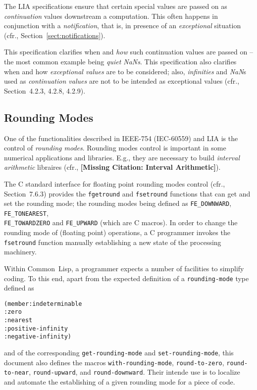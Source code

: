 \documentclass[10pt,fleqn]{article}
\newcommand{\CL}{\textsf{Common~Lisp}}
\newcommand{\CLang}{\textsf{C}}
\newcommand{\checkcite}[1]{{\textbf{[Missing Citation: #1]}}}
\newcommand{\code}[1]{\texttt{#1}}
\newcommand{\clieeeterm}[1]{\textit{#1}}
\newcommand{\IEEEFPStd}{IEEE-754}
\newcommand{\IECFPStd}{IEC-60559}
\begin{document}
The LIA specifications ensure that certain special values are passed
on as \emph{continuation} values downstream a computation.  This often
happens in conjunction with a \emph{notification}, that is, in
presence of an \emph{exceptional} situation (cfr.,
Section~\ref{sect:notifications}).

This specification clarifies when and \emph{how} such continuation
values are passed on -- the most common example being
\clieeeterm{quiet NaNs}.  This specification also clarifies when and
how \emph{exceptional values} are to be considered; also,
\clieeeterm{infinities} and \clieeeterm{NaN}s used as
\emph{continuation values} are not to be intended as exceptional
values (cfr., \cite{2012:LIA1} Section~4.2.3, 4.2.8, 4.2.9).



\subsection{Rounding Modes}

One of the functionalities described in \IEEEFPStd{} (\IECFPStd{}) and LIA is
the control of \emph{rounding modes}.  Rounding modes control is
important in some numerical applications and libraries.  E.g., they
are necessary to build \emph{interval arithmetic} libraires (cfr.,
\checkcite{Interval Arithmetic}).

The \CLang{} standard interface for floating point rounding modes
control (cfr., \cite{2018:C18} Section~7.6.3) provides the \code{fgetround}
and \code{fsetround} functions that can get and set the rounding mode;
the rounding modes being defined as \code{FE\_DOWNWARD},
\code{FE\_TONEAREST},\\
\code{FE\_TOWARDZERO} and \code {FE\_UPWARD} (which are \CLang{}
macros).  In order to change the rounding mode of (floating point)
operations, a \CLang{} programmer invokes the \code{fsetround}
function manually establishing a new state of the processing
machinery.

Within \CL{}, a programmer expects a number of facilities to simplify
coding.  To this end, apart from the expected definition of a
\code{rounding-mode} type defined as
\begin{alltt}
(member :indeterminable
        :zero
        :nearest
        :positive-infinity
        :negative-infinity)
\end{alltt}
and of the corresponding \code{get-rounding-mode} and
\code{set-rounding-mode}, this document also defines the macros
\code{with-rounding-mode}, \code{round-to-zero}, \code{round-to-near},
\code{round-upward}, and \code{round-downward}.  Their intende use is
to localize and automate the establishing of a given rounding mode for
a piece of code.
\end{document}
